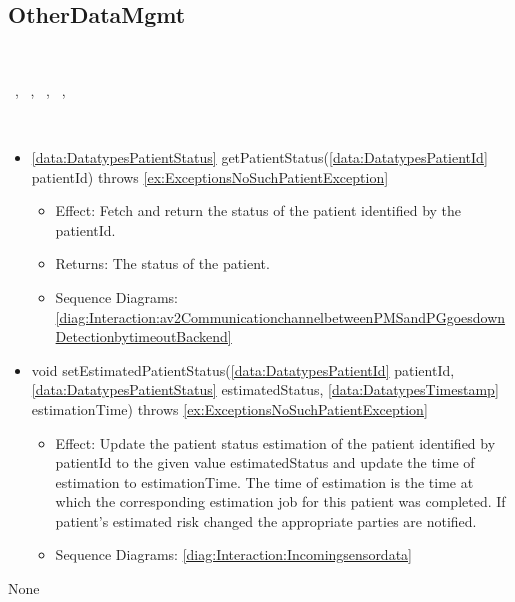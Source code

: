  \subsection{OtherDataMgmt}\label{int:InterfacesOtherDataMgmt}
    \begin{description}
      \item[Provided by:] \iconcomponent{}~
      \item[Required by:] \iconcomponent{}~, \iconcomponent{}~, \iconcomponent{}~, \iconcomponent{}~, \iconcomponent{}~ 
      \item[Operations:] ~
    \begin{itemize}[noitemsep,nolistsep,leftmargin=-.25cm]
      \item \textsf{\ref{data:DatatypesPatientStatus} getPatientStatus(\ref{data:DatatypesPatientId} patientId) throws \ref{ex:ExceptionsNoSuchPatientException}}
        \begin{itemize}[noitemsep,nolistsep]
           \item Effect: Fetch and return the status of the patient identified by the patientId. 
           \item Returns: The status of the patient.
           \item Sequence Diagrams: \cref{diag:Interaction:av2CommunicationchannelbetweenPMSandPGgoesdownDetectionbytimeoutBackend}
        \end{itemize}
      \item \textsf{void setEstimatedPatientStatus(\ref{data:DatatypesPatientId} patientId, \ref{data:DatatypesPatientStatus} estimatedStatus, \ref{data:DatatypesTimestamp} estimationTime) throws \ref{ex:ExceptionsNoSuchPatientException}}
        \begin{itemize}[noitemsep,nolistsep]
           \item Effect: Update the patient status estimation of the patient identified by patientId to the given value estimatedStatus and update the time of estimation to estimationTime. The time of estimation is the time at which the corresponding estimation job for this patient was completed. If patient's estimated risk changed the appropriate parties are notified. 
           \item Sequence Diagrams: \cref{diag:Interaction:Incomingsensordata}
        \end{itemize}
    \end{itemize}
      \item[Diagrams:] None
    \end{description}

